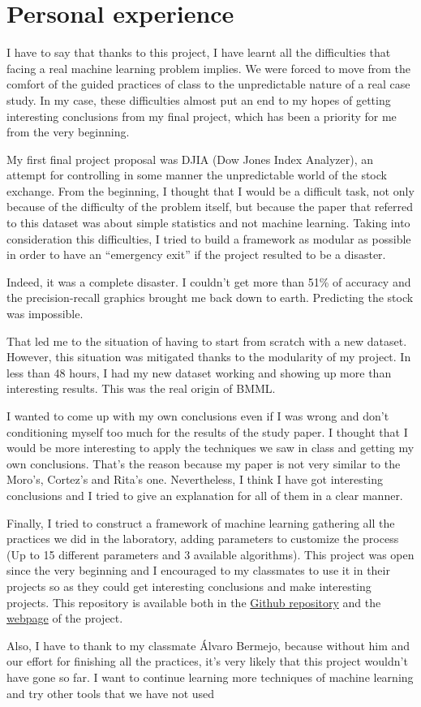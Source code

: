 \chapter {Personal experience}

I have to say that thanks to this project, I have learnt all the
difficulties that facing a real machine learning problem implies. We
were forced to move from the comfort of the guided practices of class to
the unpredictable nature of a real case study. In my case, these
difficulties almost put an end to my hopes of getting interesting
conclusions from my final project, which has been a priority for me from
the very beginning.

My first final project proposal was DJIA (Dow Jones Index Analyzer), an
attempt for controlling in some manner the unpredictable world of the
stock exchange. From the beginning, I thought that I would be a
difficult task, not only because of the difficulty of the problem
itself, but because the paper that referred to this dataset was about
simple statistics and not machine learning. Taking into consideration
this difficulties, I tried to build a framework as modular as possible
in order to have an ``emergency exit'' if the project resulted to be a
disaster.

Indeed, it was a complete disaster. I couldn't get more than 51\% of
accuracy and the precision-recall graphics brought me back down to
earth. Predicting the stock was impossible.

That led me to the situation of having to start from scratch with a new
dataset. However, this situation was mitigated thanks to the modularity
of my project. In less than 48 hours, I had my new dataset working and
showing up more than interesting results. This was the real origin of
BMML.

I wanted to come up with my own conclusions even if I was wrong and
don't conditioning myself too much for the results of the study paper. I
thought that I would be more interesting to apply the techniques we saw
in class and getting my own conclusions. That's the reason because my
paper is not very similar to the Moro's, Cortez's and Rita's one.
Nevertheless, I think I have got interesting conclusions and I tried to
give an explanation for all of them in a clear manner.

Finally, I tried to construct a framework of machine learning gathering
all the practices we did in the laboratory, adding parameters to
customize the process (Up to 15 different parameters and 3 available
algorithms). This project was open since the very beginning and I
encouraged to my classmates to use it in their projects so as they could
get interesting conclusions and make interesting projects. This
repository is available both in the
\href{https://github.com/franloza/BMML}{Github repository} and the
\href{http://franloza.github.io/BMML/}{webpage} of the project.

Also, I have to thank to my classmate \'Alvaro Bermejo, because without him
and our effort for finishing all the practices, it's very likely that
this project wouldn't have gone so far. I want to continue learning more
techniques of machine learning and try other tools that we have not used